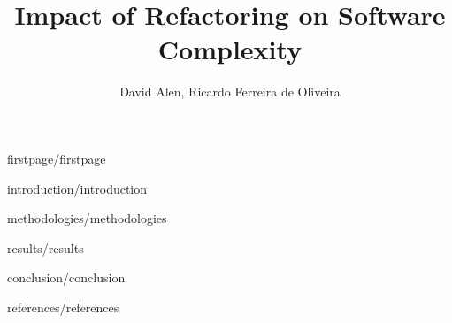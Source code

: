\documentclass[12pt]{article}
\title{Impact of Refactoring on Software Complexity}
\author{David Alen\inst{1}, Ricardo Ferreira de Oliveira\inst{1}}
\begin{document}
{firstpage/firstpage}

{introduction/introduction}

{methodologies/methodologies}

{results/results}

{conclusion/conclusion}

{references/references}
\end{document}
